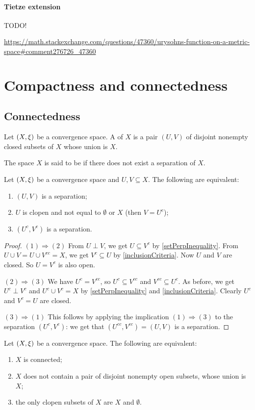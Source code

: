 \subsubsection{Tietze extension}
TODO!

\url{https://math.stackexchange.com/questions/47360/urysohns-function-on-a-metric-space#comment276726_47360}

\chapter{Compactness and connectedness}


\section{Connectedness}
\begin{definition}
Let $\left( X, \xi \right)$ be a convergence space. A  of $X$ is a pair $(U,V)$ of disjoint nonempty closed subsets of $X$ whose union is $X$.

The space $X$ is said to be  if there does not exist a separation of $X$.
\end{definition}

\begin{lemma} \label{disconnectionLemma}
Let $\left( X, \xi \right)$ be a convergence space and $U,V\subseteq X$. The following are equivalent:
\begin{enumerate}
\item $(U, V)$ is a separation;
\item $U$ is clopen and not equal to $\emptyset$ or $X$ (then $V= U^c$);
\item $(U^c, V^c)$ is a separation.
\end{enumerate}
\end{lemma}
\begin{proof}
$(1) \Rightarrow (2)$ From $U\perp V$, we get $U\subseteq V^c$ by \ref{setPerpInequality}. From $U\cup V = U\cup V^{cc} = X$, we get $V^c \subseteq U$ by \ref{inclusionCriteria}. Now $U$ and $V$ are closed. So $U = V^c$ is also open.

$(2) \Rightarrow (3)$ We have $U^c = V^{cc}$, so $U^c \subseteq V^{cc}$ and $V^{cc}\subseteq U^c$. As before, we get $U^c\perp V^c$ and $U^c \cup V^c = X$ by \ref{setPerpInequality} and \ref{inclusionCriteria}. Clearly $U^c$ and $V^c = U$ are closed.

$(3) \Rightarrow (1)$ This follows by applying the implication $(1) \Rightarrow (3)$ to the separation $(U^c, V^c)$: we get that $(U^{cc}, V^{cc}) = (U,V)$ is a separation.
\end{proof}
\begin{corollary} \label{connectedCriteria}
Let $\left( X, \xi \right)$ be a convergence space. The following are equivalent:
\begin{enumerate}
\item $X$ is connected;
\item $X$ does not contain a pair of disjoint nonempty open subsets, whose union is $X$;
\item the only clopen subsets of $X$ are $X$ and $\emptyset$.
\end{enumerate}
\end{corollary}

